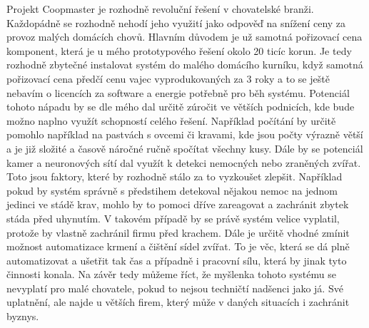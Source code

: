 Projekt Coopmaster je rozhodně revoluční řešení v chovatelské branži.
Každopádně se rozhodně nehodí jeho využití jako odpověď na snížení ceny za provoz malých domácích chovů.
Hlavním důvodem je už samotná pořizovací cena komponent, která je u mého prototypového řešení okolo 20 ticíc korun.
Je tedy rozhodně zbytečné instalovat systém do malého domácího kurníku, když samotná pořizovací cena předčí cenu vajec vyprodukovaných za 3 roky a to se ještě nebavím o licencích za software a energie potřebně pro běh systému.\newline
Potenciál tohoto nápadu by se dle mého dal určitě zúročit ve větších podnicích, kde bude možno naplno využít schopností celého řešení.
Například počítání by určitě pomohlo například na pastvách s ovcemi či kravami, kde jsou počty výrazně větší a je již složité a časově náročné ručně spočítat všechny kusy.
Dále by se potenciál kamer a neuronových sítí dal využít k detekci nemocných nebo zraněných zvířat.
Toto jsou faktory, které by rozhodně stálo za to vyzkoušet zlepšit.
Například pokud by systém správně s předstihem detekoval nějakou nemoc na jednom jedinci ve stádě krav, mohlo by to pomoci dříve zareagovat a zachránit zbytek stáda před uhynutím.
V takovém případě by se právě systém velice vyplatil, protože by vlastně zachránil firmu před krachem.\newline
Dále je určitě vhodné zmínit možnost automatizace krmení a čištění sídel zvířat.
To je věc, která se dá plně automatizovat a ušetřit tak čas a případně i pracovní sílu, která by jinak tyto činnosti konala.\newline
Na závěr tedy můžeme říct, že myšlenka tohoto systému se nevyplatí pro malé chovatele, pokud to nejsou techničtí nadšenci jako já.
Své uplatnění, ale najde u větších firem, který může v daných situacích i zachránit byznys.





